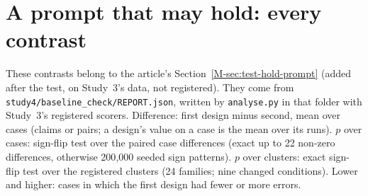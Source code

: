 \section{A prompt that may hold: every contrast}
\label{supp:hold-prompt}

These contrasts belong to the article's Section~\ref{M-sec:test-hold-prompt} (added after the test, on Study~3's data, not registered). They come from \texttt{study4/\allowbreak{}baseline\_\allowbreak{}check/\allowbreak{}REPORT.json}, written by \texttt{analyse.py} in that folder with Study~3's registered scorers. Difference: first design minus second, mean over cases (claims or pairs; a design's value on a case is the mean over its runs). $p$ over cases: sign-flip test over the paired case differences (exact up to 22 non-zero differences, otherwise 200{,}000 seeded sign patterns). $p$ over clusters: exact sign-flip test over the registered clusters (24 families; nine changed conditions). Lower and higher: cases in which the first design had fewer or more errors.

